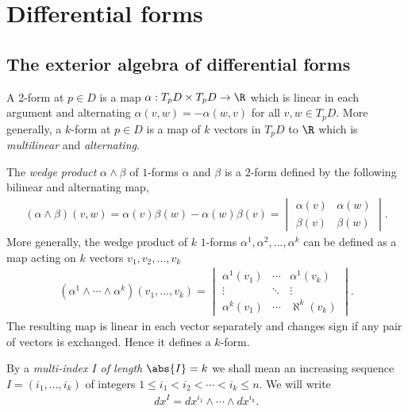 \documentclass{article}
\begin{document}
\section{Differential forms}

\subsection{The exterior algebra of differential forms}

\begin{definition}
	A 2-form at $p\in D$ is a map $\alpha:T_pD\times T_p D \to \R$ which is linear in each argument
	and alternating $\alpha(v,w)=-\alpha(w,v)$ for all $v,w\in T_pD$. More generally, a $k$-form at
	$p\in D$ is a map of $k$ vectors in $T_pD$ to $\R$ which is \emph{multilinear} and \emph{alternating}.
\end{definition}

\begin{definition}
	The \emph{wedge product} $\alpha \wedge \beta$ of $1$-forms $\alpha$ and $\beta$ is a $2$-form defined
	by the following bilinear and alternating map,
	\begin{align*}
		(\alpha\wedge\beta)(v,w) = \alpha(v)\beta(w) - \alpha(w)\beta(v) = \begin{vmatrix}
			\alpha(v) & \alpha(w) \\
			\beta(v)  & \beta(w)
		\end{vmatrix}.
	\end{align*}
	More generally, the wedge product of $k$ $1$-forms $\alpha^1,\alpha^2,...,\alpha^k$ can be defined as a
	map acting on $k$ vectors $v_1,v_2,...,v_k$
	\begin{align*}
		(\alpha^1\wedge\cdots\wedge\alpha^k)(v_1,...,v_k) = \begin{vmatrix}
			\alpha^1(v_1) & \cdots & \alpha^1(v_k) \\
			\vdots        & \ddots & \vdots        \\
			\alpha^k(v_1) & \cdots & \aleph^k(v_k)
		\end{vmatrix}.
	\end{align*}
	The resulting map is linear in each vector separately and changes sign if any pair of vectors is exchanged.
	Hence it defines a $k$-form.
\end{definition}

\begin{definition}
	By a \emph{multi-index $I$ of length $\abs{I}=k$} we shall mean an increasing sequence
	$I=(i_1,...,i_k)$ of integers $1\leq i_1<i_2<\cdots<i_k\leq n$. We will write
	\begin{align*}
		dx^I = dx^{i_1} \wedge \cdots \wedge dx^{i_k}.
	\end{align*}
\end{definition}
\end{document}
